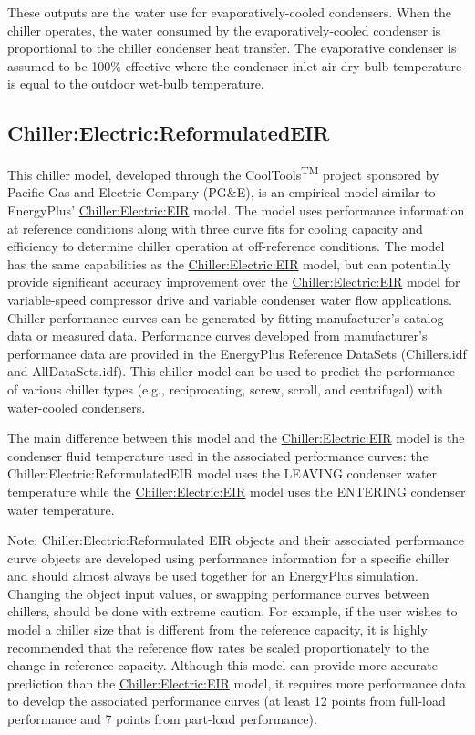 These outputs are the water use for evaporatively-cooled condensers. When the chiller operates, the water consumed by the evaporatively-cooled condenser is proportional to the chiller condenser heat transfer. The evaporative condenser is assumed to be 100\% effective where the condenser inlet air dry-bulb temperature is equal to the outdoor wet-bulb temperature.

\subsection{Chiller:Electric:ReformulatedEIR}\label{chillerelectricreformulatedeir}

This chiller model, developed through the CoolTools\textsuperscript{TM} project sponsored by Pacific Gas and Electric Company (PG\&E), is an empirical model similar to EnergyPlus' \hyperref[chillerelectriceir]{Chiller:Electric:EIR} model. The model uses performance information at reference conditions along with three curve fits for cooling capacity and efficiency to determine chiller operation at off-reference conditions. The model has the same capabilities as the \hyperref[chillerelectriceir]{Chiller:Electric:EIR} model, but can potentially provide significant accuracy improvement over the \hyperref[chillerelectriceir]{Chiller:Electric:EIR} model for variable-speed compressor drive and variable condenser water flow applications. Chiller performance curves can be generated by fitting manufacturer's catalog data or measured data. Performance curves developed from manufacturer's performance data are provided in the EnergyPlus Reference DataSets (Chillers.idf and AllDataSets.idf). This chiller model can be used to predict the performance of various chiller types (e.g., reciprocating, screw, scroll, and centrifugal) with water-cooled condensers.

The main difference between this model and the \hyperref[chillerelectriceir]{Chiller:Electric:EIR} model is the condenser fluid temperature used in the associated performance curves: the Chiller:Electric:ReformulatedEIR model uses the LEAVING condenser water temperature while the \hyperref[chillerelectriceir]{Chiller:Electric:EIR} model uses the ENTERING condenser water temperature.

Note: Chiller:Electric:Reformulated EIR objects and their associated performance curve objects are developed using performance information for a specific chiller and should almost always be used together for an EnergyPlus simulation. Changing the object input values, or swapping performance curves between chillers, should be done with extreme caution. For example, if the user wishes to model a chiller size that is different from the reference capacity, it is highly recommended that the reference flow rates be scaled proportionately to the change in reference capacity. Although this model can provide more accurate prediction than the \hyperref[chillerelectriceir]{Chiller:Electric:EIR} model, it requires more performance data to develop the associated performance curves (at least 12 points from full-load performance and 7 points from part-load performance).

